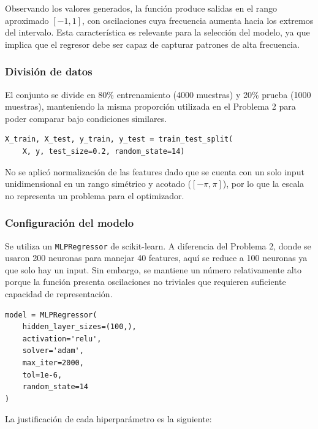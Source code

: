 \documentclass{article}
\begin{document}
Observando los valores generados, la función produce salidas en el rango aproximado $[-1, 1]$, con oscilaciones cuya frecuencia aumenta hacia los extremos del intervalo. Esta característica es relevante para la selección del modelo, ya que implica que el regresor debe ser capaz de capturar patrones de alta frecuencia.

\subsubsection{División de datos}

El conjunto se divide en 80\% entrenamiento (4000 muestras) y 20\% prueba (1000 muestras), manteniendo la misma proporción utilizada en el Problema 2 para poder comparar bajo condiciones similares.

\begin{lstlisting}
X_train, X_test, y_train, y_test = train_test_split(
    X, y, test_size=0.2, random_state=14)
\end{lstlisting}

No se aplicó normalización de las features dado que se cuenta con un solo input unidimensional en un rango simétrico y acotado ($[-\pi, \pi]$), por lo que la escala no representa un problema para el optimizador.

\subsubsection{Configuración del modelo}

Se utiliza un \texttt{MLPRegressor} de scikit-learn. A diferencia del Problema 2, donde se usaron 200 neuronas para manejar 40 features, aquí se reduce a 100 neuronas ya que solo hay un input. Sin embargo, se mantiene un número relativamente alto porque la función presenta oscilaciones no triviales que requieren suficiente capacidad de representación.

\begin{lstlisting}
model = MLPRegressor(
    hidden_layer_sizes=(100,),
    activation='relu',
    solver='adam',
    max_iter=2000,
    tol=1e-6,
    random_state=14
)
\end{lstlisting}

La justificación de cada hiperparámetro es la siguiente:
\end{document}
